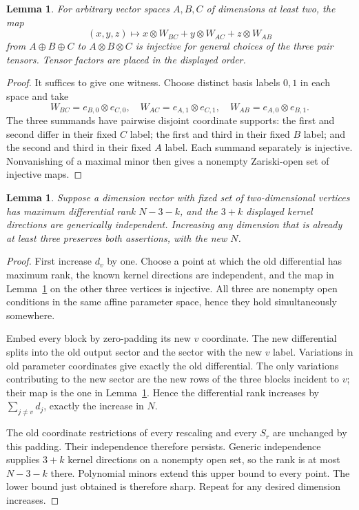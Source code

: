 \documentclass[11pt]{article}
\newtheorem{lemma}[theorem]{Lemma}
\theoremstyle{remark}\newtheorem{remark}[theorem]{Remark}
\begin{document}
\begin{lemma}\label{lem:triple-injectivity}
For arbitrary vector spaces $A,B,C$ of dimensions at least two, the map
\[
 (x,y,z)\longmapsto x\otimes W_{BC}+y\otimes W_{AC}
                         +z\otimes W_{AB}
\]
from $A\oplus B\oplus C$ to $A\otimes B\otimes C$ is injective for
general choices of the three pair tensors. Tensor factors are placed in
the displayed order.
\end{lemma}
\begin{proof}
It suffices to give one witness. Choose distinct basis labels $0,1$ in
each space and take
\[
 W_{BC}=e_{B,0}\otimes e_{C,0},\quad
 W_{AC}=e_{A,1}\otimes e_{C,1},\quad
 W_{AB}=e_{A,0}\otimes e_{B,1}.
\]
The three summands have pairwise disjoint coordinate supports: the first
and second differ in their fixed $C$ label; the first and third in their
fixed $B$ label; and the second and third in their fixed $A$ label. Each
summand separately is injective. Nonvanishing of a maximal minor then
gives a nonempty Zariski-open set of injective maps.
\end{proof}

\begin{lemma}\label{lem:four-padding}
Suppose a dimension vector with fixed set of two-dimensional vertices
has maximum differential rank $N-3-k$, and the $3+k$ displayed kernel
directions are generically independent. Increasing any dimension that
is already at least three preserves both assertions, with the new $N$.
\end{lemma}
\begin{proof}
First increase $d_v$ by one. Choose a point at which the old differential
has maximum rank, the known kernel directions are independent, and the
map in Lemma~\ref{lem:triple-injectivity} on the other three vertices is
injective. All three are nonempty open conditions in the same affine
parameter space, hence they hold simultaneously somewhere.

Embed every block by zero-padding its new $v$ coordinate. The new
differential splits into the old output sector and the sector with the
new $v$ label. Variations in old parameter coordinates give exactly the
old differential. The only variations contributing to the new sector
are the new rows of the three blocks incident to $v$; their map is the
one in Lemma~\ref{lem:triple-injectivity}. Hence the differential rank
increases by $\sum_{j\ne v}d_j$, exactly the increase in $N$.

The old coordinate restrictions of every rescaling and every $S_r$
are unchanged by this padding. Their independence therefore persists.
Generic independence supplies $3+k$ kernel directions on a nonempty
open set, so the rank is at most $N-3-k$ there. Polynomial minors extend
this upper bound to every point. The lower bound just obtained is
therefore sharp. Repeat for any desired dimension increases.
\end{proof}
\end{document}
